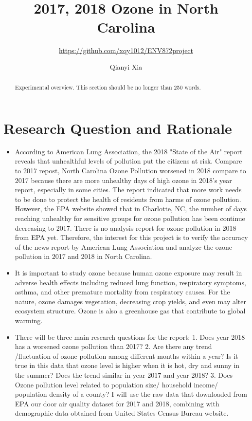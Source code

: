 \documentclass[12pt,]{article}
\title{2017, 2018 Ozone in North Carolina}
\subtitle{\url{https://github.com/xqy1012/ENV872project}}
\author{Qianyi Xia}
\date{}
\begin{document}
\maketitle
\begin{abstract}
Experimental overview. This section should be no longer than 250 words.
\end{abstract}

\newpage

\tableofcontents  \newpage
\listoftables  \newpage
\listoffigures  \newpage

\section{Research Question and
Rationale}\label{research-question-and-rationale}

\begin{itemize}
\item[]      According to American Lung Association, the 2018 "State of the Air" report reveals that unhealthful levels of pollution put the citizens at risk.  Compare to 2017 repost, North Carolina Ozone Pollution worsened in 2018 compare to 2017 because there are more unhealthy days of high ozone in 2018's year report, especially in some cities. The report indicated that more work needs to be done to protect the health of residents from harms of ozone pollution. However, the EPA website showed that in Charlotte, NC, the number of days reaching unhealthy for sensitive groups for ozone pollution has been continue decreasing to 2017. There is no analysis report for ozone pollution in 2018 from EPA yet. Therefore, the interest for this project is to verify the accuracy of the news report by American Lung Association and analyze the ozone pollution in 2017 and 2018 in North Carolina.  
\item[]     It is important to study ozone because human ozone exposure may result in adverse health effects including reduced lung function, respiratory symptoms, asthma, and other premature mortality from respiratory causes. For the nature, ozone damages vegetation, decreasing crop yields, and even may alter ecosystem structure. Ozone is also a greenhouse gas that contribute to global warming.  
\item[]      There will be three main research questions for the report: 1. Does year 2018 has a worsened ozone pollution than 2017? 2. Are there any trend /fluctuation of ozone pollution among different months within a year? Is it true in this data that ozone level is higher when it is hot, dry and sunny in the summer? Does the trend similar in year 2017 and year 2018? 3. Does Ozone pollution level related to population size/ household income/ population density of a county? I will use the raw data that downloaded from EPA our door air quality dataset for 2017 and 2018, combining with demographic data obtained from United States Census Bureau website.
\end{itemize}
\end{document}
